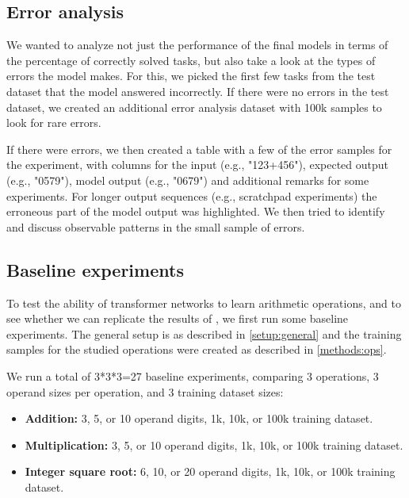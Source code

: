 \subsection{Error analysis}
\label{setup:error}

We wanted to analyze not just the performance of the final models in terms of the percentage of correctly solved tasks, but also take a look at the types of errors the model makes.
For this, we picked the first few tasks from the test dataset that the model answered incorrectly. If there were no errors in the test dataset, we created an additional error analysis dataset with 100k samples to look for rare errors.

If there were errors, we then created a table with a few of the error samples for the experiment, with columns for the input (e.g., "123+456"), expected output (e.g., "0579"), model output (e.g., "0679") and additional remarks for some experiments. For longer output sequences (e.g., scratchpad experiments) the erroneous part of the model output was highlighted.
We then tried to identify and discuss observable patterns in the small sample of errors.

\subsection{Baseline experiments}
\label{setup:baseline}

To test the ability of transformer networks to learn arithmetic operations, and to see whether we can replicate the results of \cite{teaching}, we first run some baseline experiments. The general setup is as described in \cref{setup:general} and the training samples for the studied operations were created as described in \cref{methods:ops}.



We run a total of 3*3*3=27 baseline experiments, comparing 3 operations, 3 operand sizes per operation, and 3 training dataset sizes:
 
\begin{itemize}
	\item \textbf{Addition:} 3, 5, or 10 operand digits, 1k, 10k, or 100k training dataset.
	\item \textbf{Multiplication:} 3, 5, or 10 operand digits, 1k, 10k, or 100k training dataset.
	\item \textbf{Integer square root:} 6, 10, or 20 operand digits, 1k, 10k, or 100k training dataset.
\end{itemize}


